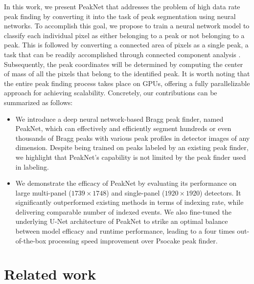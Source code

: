 \documentclass[conference]{IEEEtran}
\newcommand{\peaknet}{PeakNet}
\newcommand{\psocake}{Psocake}
\begin{document}
In this work, we present \peaknet{} that addresses the problem of high data rate
peak finding by converting it into the task of peak segmentation using neural
networks.  To accomplish this goal, we propose to train a neural network model
to classify each individual pixel as either belonging to a peak or not belonging to a peak.
This is followed by converting a connected area of pixels as a single peak, a
task that can be readily accomplished through connected component analysis
\citep{weaverCentrosymmetricCrossSymmetricMatrices1985}.  Subsequently, the peak
coordinates will be determined by computing the center of mass of all the pixels
that belong to the identified peak.  It is worth noting that the entire peak
finding process takes place on GPUs, offering a fully parallelizable approach for
achieving scalability.  Concretely, our contributions can be summarized as
follows:

\begin{itemize}

    \item We introduce a deep neural network-based Bragg peak finder, named
    \peaknet{}, which can effectively and efficiently segment hundreds or even
    thousands of Bragg peaks with various peak profiles in detector images of
    any dimension.  Despite being trained on peaks labeled by an existing peak finder,
    we highlight that \peaknet{}'s capability is not limited by the peak finder
    used in labeling.

    \item We demonstrate the efficacy of \peaknet{} by evaluating its
    performance on large multi-panel ($1739 \times 1748$) and single-panel
    ($1920 \times 1920$) detectors.  It significantly outperformed existing
    methods in terms of indexing rate, while delivering comparable number of
    indexed events.  We also fine-tuned the underlying U-Net architecture of
    \peaknet{} to strike an optimal balance between model efficacy and runtime
    performance, leading to a four times out-of-the-box processing speed improvement over \psocake{} peak finder.

\end{itemize}


\section{Related work}
\end{document}
